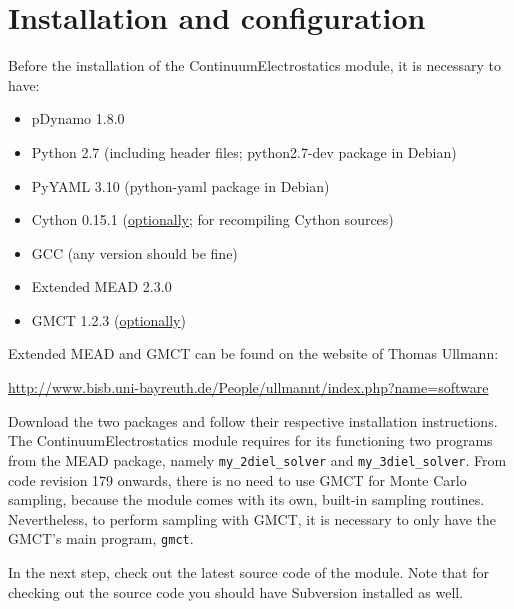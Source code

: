 \documentclass[a4paper,11pt]{article}
\newcommand{\modulename}{ContinuumElectrostatics\xspace}
\begin{document}



\section{Installation and configuration}
Before the installation of the \modulename module, it is necessary
to have:
\begin{itemize}
\itemsep0pt 
  \item pDynamo 1.8.0
  \item Python 2.7 (including header files; python2.7-dev package in Debian)
  \item PyYAML 3.10 (python-yaml package in Debian)
  \item Cython 0.15.1 (\underline{optionally}; for recompiling Cython sources)
  \item GCC (any version should be fine)
  \item Extended MEAD 2.3.0
  \item GMCT 1.2.3 (\underline{optionally})
\end{itemize}
%
Extended MEAD and GMCT can be found on the website of Thomas Ullmann:

\url{http://www.bisb.uni-bayreuth.de/People/ullmannt/index.php?name=software}

Download the two packages and follow their respective installation
instructions.
%
The \modulename module requires for its functioning two programs
from the MEAD package, namely \texttt{my\_2diel\_solver} and \texttt{my\_3diel\_solver}.
%
From code revision 179 onwards,
there is no need to use GMCT for Monte Carlo sampling,
because the module comes with its own, built-in sampling routines.
%
Nevertheless,
to perform sampling with GMCT,
it is necessary to only have the 
GMCT's main program, \texttt{gmct}.

\bigskip
In the next step, check out the latest source code of the module.
%
Note that for checking out the source code you should have Subversion installed
as well.
\end{document}

